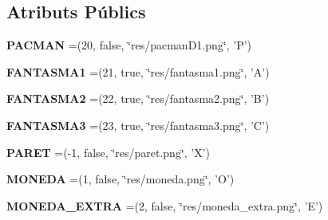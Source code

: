 \subsection*{Atributs Públics}
\begin{DoxyCompactItemize}
\item 
\hypertarget{enumlogica_1_1enumeracions_1_1_e_element_a983b49d3055700f77c186d12a0e36e01}{{\bfseries P\+A\+C\+M\+A\+N} =(20, false, \char`\"{}res/pacman\+D1.\+png\char`\"{}, 'P')}\label{enumlogica_1_1enumeracions_1_1_e_element_a983b49d3055700f77c186d12a0e36e01}

\item 
\hypertarget{enumlogica_1_1enumeracions_1_1_e_element_ab71df0523d6da54ef29a4c8cf034924d}{{\bfseries F\+A\+N\+T\+A\+S\+M\+A1} =(21, true, \char`\"{}res/fantasma1.\+png\char`\"{}, 'A')}\label{enumlogica_1_1enumeracions_1_1_e_element_ab71df0523d6da54ef29a4c8cf034924d}

\item 
\hypertarget{enumlogica_1_1enumeracions_1_1_e_element_a49cc18019e63517fed6b5b1494e360d1}{{\bfseries F\+A\+N\+T\+A\+S\+M\+A2} =(22, true, \char`\"{}res/fantasma2.\+png\char`\"{}, 'B')}\label{enumlogica_1_1enumeracions_1_1_e_element_a49cc18019e63517fed6b5b1494e360d1}

\item 
\hypertarget{enumlogica_1_1enumeracions_1_1_e_element_ae0551be2ee24b0da8219a637f85ea343}{{\bfseries F\+A\+N\+T\+A\+S\+M\+A3} =(23, true, \char`\"{}res/fantasma3.\+png\char`\"{}, 'C')}\label{enumlogica_1_1enumeracions_1_1_e_element_ae0551be2ee24b0da8219a637f85ea343}

\item 
\hypertarget{enumlogica_1_1enumeracions_1_1_e_element_a34ee6e54a3e9a7fcbefb0b263b3cafdc}{{\bfseries P\+A\+R\+E\+T} =(-\/1, false, \char`\"{}res/paret.\+png\char`\"{}, 'X')}\label{enumlogica_1_1enumeracions_1_1_e_element_a34ee6e54a3e9a7fcbefb0b263b3cafdc}

\item 
\hypertarget{enumlogica_1_1enumeracions_1_1_e_element_ab3c6802b93ac6841b6b7d060f8a1658d}{{\bfseries M\+O\+N\+E\+D\+A} =(1, false, \char`\"{}res/moneda.\+png\char`\"{}, 'O')}\label{enumlogica_1_1enumeracions_1_1_e_element_ab3c6802b93ac6841b6b7d060f8a1658d}

\item 
\hypertarget{enumlogica_1_1enumeracions_1_1_e_element_a17b4a575b6810c535861bf2166a95478}{{\bfseries M\+O\+N\+E\+D\+A\+\_\+\+E\+X\+T\+R\+A} =(2, false, \char`\"{}res/moneda\+\_\+extra.\+png\char`\"{}, 'E')}\label{enumlogica_1_1enumeracions_1_1_e_element_a17b4a575b6810c535861bf2166a95478}


\end{DoxyCompactItemize}
